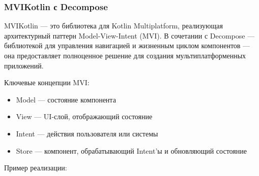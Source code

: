\documentclass[14pt, russian]{scrartcl}
\begin{document}
\subsubsection{MVIKotlin с Decompose}

MVIKotlin — это библиотека для Kotlin Multiplatform, реализующая архитектурный паттерн Model-View-Intent (MVI). В сочетании с Decompose — библиотекой для управления навигацией и жизненным циклом компонентов — она предоставляет полноценное решение для создания мультиплатформенных приложений.

Ключевые концепции MVI:
\begin{itemize}
    \item Model — состояние компонента
    \item View — UI-слой, отображающий состояние
    \item Intent — действия пользователя или системы
    \item Store — компонент, обрабатывающий Intent'ы и обновляющий состояние
\end{itemize}

Пример реализации:
\end{document}
